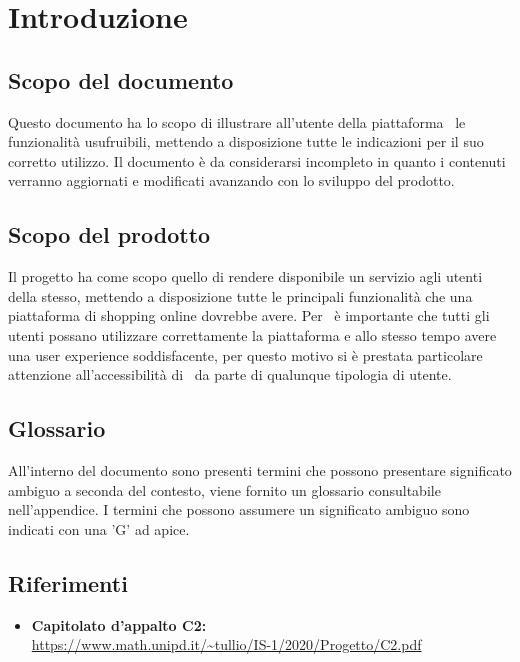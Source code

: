 \section{Introduzione}
\label{Introduzione}
\subsection{Scopo del documento}
Questo documento ha lo scopo di illustrare all'utente della piattaforma \NomeProgetto\ le funzionalità usufruibili, mettendo a disposizione tutte le indicazioni per il suo corretto utilizzo. Il documento è da considerarsi incompleto in quanto i contenuti verranno aggiornati e modificati avanzando con lo sviluppo del prodotto.
\subsection{Scopo del prodotto} 
Il progetto {\NomeProgetto} ha come scopo quello di rendere disponibile un servizio  agli utenti della stesso, mettendo a disposizione tutte le principali funzionalità che una piattaforma di shopping online dovrebbe avere.
Per \Gruppo\ è importante che tutti gli utenti possano utilizzare correttamente la piattaforma e allo stesso tempo avere una user experience soddisfacente, per questo motivo si è prestata particolare attenzione all'accessibilità di \NomeProgetto\ da parte di qualunque tipologia di utente.
\subsection{Glossario}
All'interno del documento sono presenti termini che possono presentare significato ambiguo a seconda del contesto, viene fornito un glossario consultabile nell'appendice. I termini che possono assumere un significato ambiguo sono indicati con una 'G' ad apice. 
\subsection{Riferimenti}
\begin{itemize}
	\item \textbf{Capitolato d'appalto C2:}\\
	\url{https://www.math.unipd.it/~tullio/IS-1/2020/Progetto/C2.pdf}
\end{itemize}